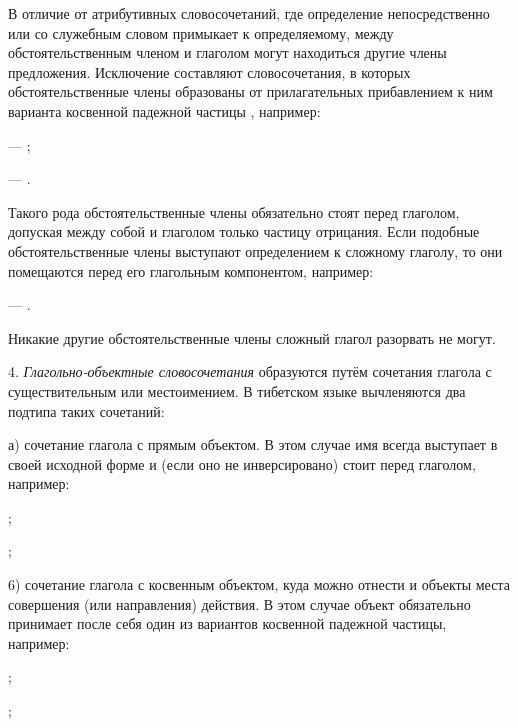 В отличие от атрибутивных словосочетаний, где определение непосредственно или со служебным словом примыкает к определяемому, между обстоятельственным членом и глаголом могут находиться другие члены предложения. Исключение составляют словосочетания, в которых обстоятельственные члены образованы от прилагательных прибавлением к ним варианта косвенной падежной частицы , например:	
\begin{prfsample}
	\item {} --- ;
	\item {} --- .
\end{prfsample}
Такого рода обстоятельственные члены обязательно стоят перед глаголом, допуская между собой и глаголом только частицу отрицания. Если подобные обстоятельственные члены выступают определением к сложному глаголу, то они помещаются перед его глагольным компонентом, например:
\begin{prfsample}
	\item {} --- .
\end{prfsample}
Никакие другие обстоятельственные члены сложный глагол разорвать не могут.

4. \emph{Глагольно-объектные словосочетания} образуются путём сочетания глагола с существительным или местоимением. В тибетском языке вычленяются два подтипа таких сочетаний:

а) сочетание глагола с прямым объектом. В этом случае имя всегда выступает в своей исходной форме и (если оно не инверсировано) стоит перед глаголом, например:
\begin{prfsample}
	\item {};
	\item {};
\end{prfsample}
6) сочетание глагола с косвенным объектом, куда можно отнести и объекты места совершения (или направления) действия. В этом случае объект обязательно принимает после себя один из вариантов косвенной падежной частицы, например:
\begin{prfsample}
	\item {};
	\item {};
\end{prfsample}

